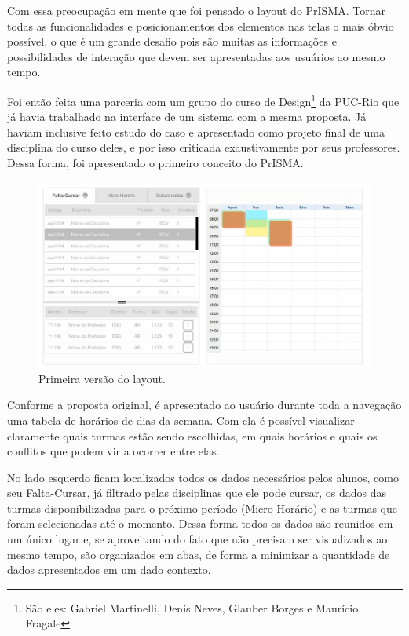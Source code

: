 \documentclass[graduacao,brazil]{ThesisPUC}
\begin{document}
Com essa preocupação em mente que foi pensado o layout do PrISMA. Tornar todas as funcionalidades e posicionamentos dos elementos nas telas o mais óbvio possível, o que é um grande desafio pois são muitas as informações e possibilidades de interação que devem ser apresentadas aos usuários ao mesmo tempo.

Foi então feita uma parceria com um grupo do curso de Design\footnote{São eles: Gabriel Martinelli, Denis Neves, Glauber Borges e Maurício Fragale} da PUC-Rio que já havia trabalhado na interface de um sistema com a mesma proposta. Já haviam inclusive feito estudo do caso e apresentado como projeto final de uma disciplina do curso deles, e por isso criticada exaustivamente por seus professores. Dessa forma, foi apresentado o primeiro conceito do PrISMA.

\begin{figure}[H]
    \centering
    \includegraphics[width=\linewidth]{img/prisma.jpg}
    \caption{Primeira versão do layout.}
\end{figure}

Conforme a proposta original, é apresentado ao usuário durante toda a navegação uma tabela de horários de dias da semana. Com ela é possível visualizar claramente quais turmas estão sendo escolhidas, em quais horários e quais os conflitos que podem vir a ocorrer entre elas.

No lado esquerdo ficam localizados todos os dados necessários pelos alunos, como seu Falta-Cursar, já filtrado pelas disciplinas que ele pode cursar, os dados das turmas disponibilizadas para o próximo período (Micro Horário) e as turmas que foram selecionadas até o momento. Dessa forma todos os dados são reunidos em um único lugar e, se aproveitando do fato que não precisam ser visualizados ao mesmo tempo, são organizados em abas, de forma a minimizar a quantidade de dados apresentados em um dado contexto.
\end{document}
